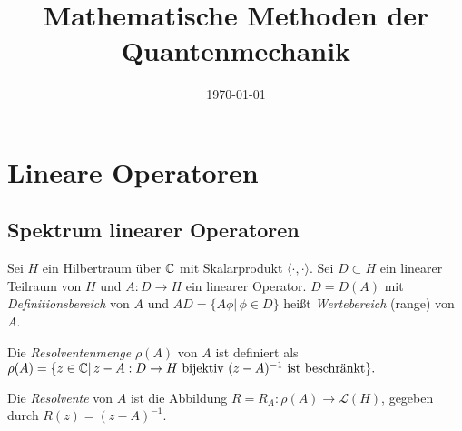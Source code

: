 \documentclass{mycourse}
\title{Mathematische Methoden der Quantenmechanik}
\author{}
\date{\today}
\begin{document}
\maketitle
\tableofcontents

\chapter{Lineare Operatoren}
\section{Spektrum linearer Operatoren}
Sei $H$ ein Hilbertraum über $\mathbb{C}$ mit Skalarprodukt $\langle \cdot, \cdot \rangle$. Sei $D\subset H$ ein linearer Teilraum von $H$ und $A:D\to H$ ein linearer Operator. $D=D(A)$ mit \emph{Definitionsbereich} von $A$ und $AD=\{A\phi|\, \phi\in D\}$ heißt \emph{Wertebereich} (range) von $A$.

Die \emph{Resolventenmenge} $\rho(A)$ von $A$ ist definiert als $\rho(A)=\{z\in \mathbb{C}|\, z-A: D\to H \text{ bijektiv $(z-A)^{-1}$ ist beschränkt}\}.$

Die \emph{Resolvente} von $A$ ist die Abbildung $R=R_A: \rho(A) \to \mathcal L(H)$, gegeben durch $R(z)=(z-A)^{-1}$.
\end{document}
